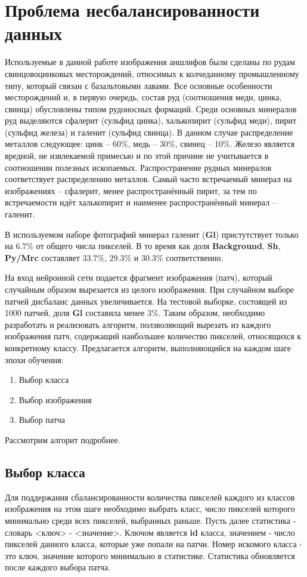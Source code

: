 \section{Проблема несбалансированности данных}
Используемые в данной работе изображения аншлифов были сделаны по рудам свинцовоцинковых месторождений, относимых к колчеданному промышленному типу, который
связан с базальтовыми лавами. Все основные особенности месторождений и, в первую
очередь, состав руд (соотношения меди, цинка, свинца) обусловлены типом рудоносных
формаций. Среди основных минералов руд выделяются сфалерит (сульфид цинка),
халькопирит (сульфид меди), пирит (сульфид железа) и галенит (сульфид свинца). В
данном случае распределение металлов следующее: цинк – 60\%, медь – 30\%, свинец – 10\%.
Железо является вредной, не извлекаемой примесью и по этой причине не учитывается в
соотношении полезных ископаемых. Распространение рудных минералов соответствует
распределению металлов. Самый часто встречаемый минерал на изображениях – сфалерит,
менее распространённый пирит, за тем по встречаемости идёт халькопирит и наименее
распространённый минерал – галенит. 
\par В используемом наборе фотографий минерал галенит (\textbf{Gl}) пристутствует только на $6.7\%$ от общего числа пикселей. В то время как доля \textbf{Background}, \textbf{Sh}, \textbf{Py/Mrc} составляет $33.7\%$, $29.3\%$ и $30.3\%$ соответственно.
\par
На вход нейронной сети подается фрагмент изображения (патч), который случайным образом вырезается из целого изображения. При случайном выборе патчей дисбаланс данных увеличивается. На тестовой выборке, состоящей из 1000 патчей, доля \textbf{Gl} составила менее $3\%$. Таким образом, необходимо разработать и реализовать алгоритм, ползволяющий вырезать из каждого изображения патч, содержащий наибольшее количество пикселей, относящихся к конкретному классу.
\newline
Предлагается алгоритм, выполняющийся на каждом шаге эпохи обучения:
\begin{enumerate}[nosep]
    \item Выбор класса
    \item Выбор изображения
    \item Выбор патча
\end{enumerate}
Рассмотрим алгорит подробнее.
\subsection{Выбор класса}
Для поддержания сбалансированности количества пикселей каждого из классов изображения на этом шаге необходимо выбрать класс, число пикселей которого минимально среди всех пикселей, выбранных раньше.
Пусть далее статистика - словарь <ключ> - <значение>. Ключом является \textbf{id} класса, значением - число пикселей данного класса, которые уже попали на патчи. Номер искомого класса - это ключ, значение которого минимально в статистике. Статистика обновляется после каждого выбора патча.
